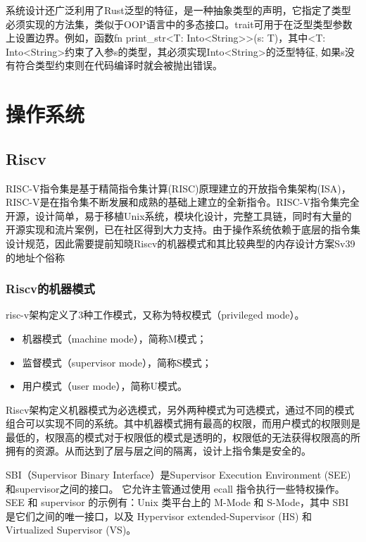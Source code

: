 系统设计还广泛利用了Rust泛型的特征，是一种抽象类型的声明，它指定了类型必须实现的方法集，类似于OOP语言中的多态接口。trait可用于在泛型类型参数上设置边界。例如，函数fn print\_str<T: Into<String>>(s: T){}，其中<T: Into<String>约束了入参s的类型，其必须实现Into<String>的泛型特征, 如果s没有符合类型约束则在代码编译时就会被抛出错误。

\section{操作系统}

\subsection{Riscv}

RISC-V指令集是基于精简指令集计算(RISC)原理建立的开放指令集架构(ISA)，RISC-V是在指令集不断发展和成熟的基础上建立的全新指令。RISC-V指令集完全开源，设计简单，易于移植Unix系统，模块化设计，完整工具链，同时有大量的开源实现和流片案例，已在社区得到大力支持。由于操作系统依赖于底层的指令集设计规范，因此需要提前知晓Riscv的机器模式和其比较典型的内存设计方案Sv39的地址个俗称
\subsubsection{Riscv的机器模式}

risc-v架构定义了3种工作模式，又称为特权模式（privileged mode）。

\begin{itemize}
    \item 机器模式（machine mode），简称M模式；
    \item 监督模式（supervisor mode），简称S模式；
    \item 用户模式（user mode），简称U模式。
\end{itemize}

Riscv架构定义机器模式为必选模式，另外两种模式为可选模式，通过不同的模式组合可以实现不同的系统。其中机器模式拥有最高的权限，而用户模式的权限则是最低的，权限高的模式对于权限低的模式是透明的，权限低的无法获得权限高的所拥有的资源。从而达到了层与层之间的隔离，设计上指令集是安全的。

SBI（Supervisor Binary Interface）是Supervisor Execution Environment (SEE)和supervisor之间的接口。 它允许主管通过使用 ecall 指令执行一些特权操作。 SEE 和 supervisor 的示例有：Unix 类平台上的 M-Mode 和 S-Mode，其中 SBI 是它们之间的唯一接口，以及 Hypervisor extended-Supervisor (HS) 和 Virtualized Supervisor (VS)。

